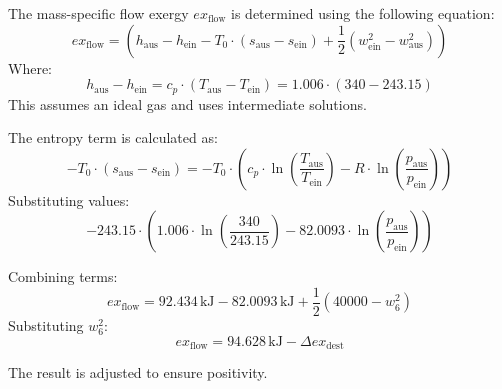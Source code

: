 The mass-specific flow exergy \( ex_{\text{flow}} \) is determined using the following equation:  
\[
ex_{\text{flow}} = (h_{\text{aus}} - h_{\text{ein}} - T_0 \cdot (s_{\text{aus}} - s_{\text{ein}}) + \frac{1}{2} (w_{\text{ein}}^2 - w_{\text{aus}}^2))
\]  
Where:  
\[
h_{\text{aus}} - h_{\text{ein}} = c_p \cdot (T_{\text{aus}} - T_{\text{ein}}) = 1.006 \cdot (340 - 243.15)
\]  
This assumes an ideal gas and uses intermediate solutions.  

The entropy term is calculated as:  
\[
-T_0 \cdot (s_{\text{aus}} - s_{\text{ein}}) = -T_0 \cdot \left( c_p \cdot \ln\left(\frac{T_{\text{aus}}}{T_{\text{ein}}}\right) - R \cdot \ln\left(\frac{p_{\text{aus}}}{p_{\text{ein}}}\right) \right)
\]  
Substituting values:  
\[
-243.15 \cdot (1.006 \cdot \ln\left(\frac{340}{243.15}\right) - 82.0093 \cdot \ln\left(\frac{p_{\text{aus}}}{p_{\text{ein}}}\right))
\]  

Combining terms:  
\[
ex_{\text{flow}} = 92.434 \, \text{kJ} - 82.0093 \, \text{kJ} + \frac{1}{2} (40000 - w_6^2)
\]  
Substituting \( w_6^2 \):  
\[
ex_{\text{flow}} = 94.628 \, \text{kJ} - \Delta ex_{\text{dest}}
\]  

The result is adjusted to ensure positivity.
